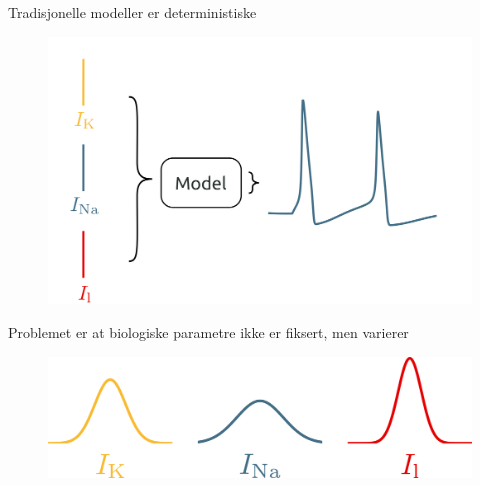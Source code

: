 \documentclass[presentation]{beamer}
\begin{document}

\begin{frame}{Tradisjonelle modeller er deterministiske}
    \begin{figure}
       \includegraphics[width=1.1\textwidth]{deterministic.png}

    \end{figure}
\end{frame}


\begin{frame}{Problemet er at biologiske parametre ikke er fiksert, men varierer}
        \vspace{-1cm}
    \begin{figure}
\includegraphics[width=1\textwidth]{distributions.png}
\end{figure}
\end{frame}
\end{document}

